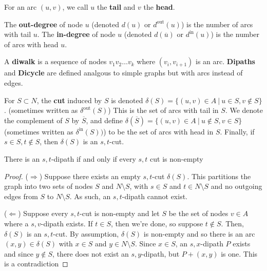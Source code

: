\documentclass[../co351.tex]{subfiles}
\begin{document}
\begin{definition}{}{}
  For an arc $(u,v)$, we call $u$ the \textbf{tail} and $v$ the \textbf{head}.

  The \textbf{out-degree} of node $u$ (denoted $d(u)$ or $d^{\text{out}}(u)$) is the number of arcs with tail $u$. The \textbf{in-degree} of node $u$ (denoted $d(\overline{u})$ or $d^{\text{in}}(u)$) is the number of arcs with head $u$.

  A \textbf{diwalk} is a sequence of nodes $v_1v_2\ldots v_k$ where $(v_i, v_{i+1})$ is an arc. \textbf{Dipaths} and \textbf{Dicycle} are defined analgous to simple graphs but with arcs instead of edges.

  For $S \subset N$, the \textbf{cut} induced by $S$ is denoted $\delta(S) = \{ (u,v) \in A \:\rvert\: u \in S, v \not\in S \}$. (sometimes written as $\delta^{\text{out}}(S)$) This is the set of arcs with tail in $S$.
  We denote the complement of $S$ by $\overline{S}$, and define $\delta(\overline{S}) = \{ (u,v) \in A \:\rvert\: u \not\in S, v \in S \}$ (sometimes written as $\delta^{\text{in}}(S))$) to be the set of arcs with head in $S$. Finally, if $s \in S, t \not\in S$, then $\delta(S)$ is an $s,t$-cut.
\end{definition}

\begin{theorem}{}{}
  There is an $s,t$-dipath if and only if every $s,t$ cut is non-empty
\end{theorem}
\begin{proof}
($\Rightarrow$) Suppose there exists an empty $s,t$-cut $\delta(S)$. This partitions the graph into two sets of nodes $S$ and $N\setminus S$, with $s \in S$ and $t \in N\setminus S$ and no outgoing edges from $S$ to $N\setminus S$. As such, an $s,t$-dipath cannot exist.

($\Leftarrow$) Suppose every $s,t$-cut is non-empty and let $S$ be the set of nodes $v \in A$ where a $s,v$-dipath exists. If $t \in S$, then we're done, so suppose $t \not\in S$. Then, $\delta(S)$ is an $s,t$-cut.
By assumption, $\delta(S)$ is non-empty and so there is an arc $(x,y) \in \delta(S)$ with $x \in S$ and $y \in N\setminus S$.
Since $x \in S$, an $s,x$-dipath $P$ exists and since $y \not\in S$, there does not exist an $s,y$-dipath, but $P + (x,y)$ is one. This is a contradiction
\end{proof}
\end{document}
